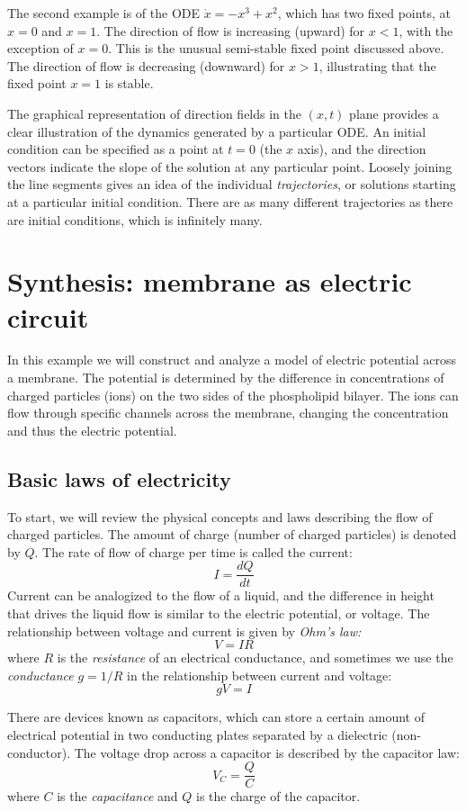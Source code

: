 \documentclass[11pt]{book}
\begin{document}
The second example is of the ODE $ \dot x = -x^3 + x^2 $, which has two fixed points, at $x=0$ and $x=1$. The direction of flow is increasing (upward) for $x < 1$, with the exception of  $x=0$. This is the unusual semi-stable fixed point discussed above. The direction of flow is decreasing (downward) for $x >1$, illustrating that the fixed point $x=1$ is stable.

The graphical representation of direction fields in the $(x,t)$ plane provides a clear illustration of the dynamics generated by a particular ODE. An initial condition can be specified as a point at $t=0$ (the $x$ axis), and the direction vectors indicate the slope of the solution at any particular point. Loosely joining the line segments gives an idea of the individual \emph{trajectories}, or solutions starting at a particular initial condition. There are as many different trajectories as there are initial conditions, which is infinitely many.

\section{Synthesis: membrane as electric circuit}
In this example we will construct and analyze a model of electric potential across a membrane. The potential is determined by the difference in concentrations of charged particles (ions) on the two sides of the phospholipid bilayer. The ions can flow through specific channels across the membrane, changing the concentration and thus the electric potential.
\subsection{Basic laws of electricity}
To start, we will review the physical concepts and laws describing the flow of charged particles. The amount of charge (number of charged particles) is denoted by $Q$. The rate of flow of charge per time is called the current:
$$I = \frac{dQ}{dt}$$
Current can be analogized to the flow of a liquid, and the difference in height that drives the liquid flow is similar to the electric potential, or voltage. The relationship between voltage and current is given by \emph{Ohm's law:}
$$ V = IR$$
where $R$ is the \emph{resistance} of an electrical conductance, and sometimes we use the \emph{conductance} $g = 1/R$ in the relationship between current and voltage:
$$gV = I$$

There are devices known as capacitors, which can store a certain amount of electrical potential in two conducting plates separated by a dielectric (non-conductor). The voltage drop across a capacitor is described by the capacitor law:
$$ V_C = \frac{Q}{C}$$
where $C$ is the \emph{capacitance} and $Q$ is the charge of the capacitor.
\end{document}
